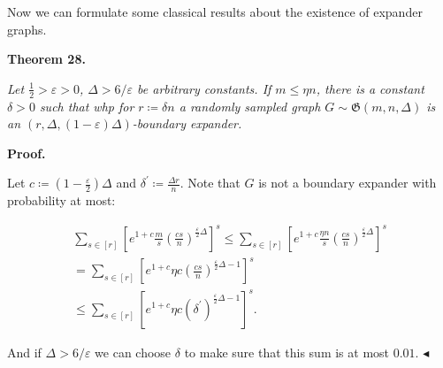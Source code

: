 Now we can formulate some classical results about the existence of expander graphs.\par





\par\medskip\noindent\textbf{
\textbf{Theorem 28}\textbf{.}
}\par



\emph{Let $\frac{1}{2}>\varepsilon>0$, $\Delta>6/\varepsilon$ be arbitrary constants. If $m\leq\eta n$, there is a constant $\delta>0$ such that whp for $r\coloneqq\delta n$ a randomly sampled
graph $G\sim\mathfrak{G}(m,n,\Delta)$ is an $(r,\Delta,(1-\varepsilon)\Delta)$-boundary
expander.}\par






\par\medskip\noindent\textbf{Proof.}\par




Let $c\coloneqq(1-\frac{\varepsilon}{2})\Delta$ and $\delta^{\prime}\coloneqq\frac{\Delta r}{n}$. Note
that $G$ is not a boundary expander with probability at most:\par


\[\begin{gathered}
\displaystyle\sum\limits_{s\in[r]}\left[e^{1+c}\frac{m}{s}\left(\frac{cs}{n}%
\right)^{\frac{\varepsilon}{2}\Delta}\right]^{s} \displaystyle\leq\sum\limits_{s\in[r]}\left[e^{1+c}\frac{\eta n}{s}\left(\frac%
{cs}{n}\right)^{\frac{\varepsilon}{2}\Delta}\right]^{s} \\
\displaystyle=\sum\limits_{s\in[r]}\left[e^{1+c}\eta c\left(\frac{cs}{n}\right%
)^{\frac{\varepsilon}{2}\Delta-1}\right]^{s} \\
\displaystyle\leq\sum\limits_{s\in[r]}\left[e^{1+c}\eta c\left(\delta^{\prime}%
\right)^{\frac{\varepsilon}{2}\Delta-1}\right]^{s}.
\end{gathered}\]




And if $\Delta>6/\varepsilon$ we can choose $\delta$ to make sure that this sum is at most
$0.01$.
$\blacktriangleleft$\par





